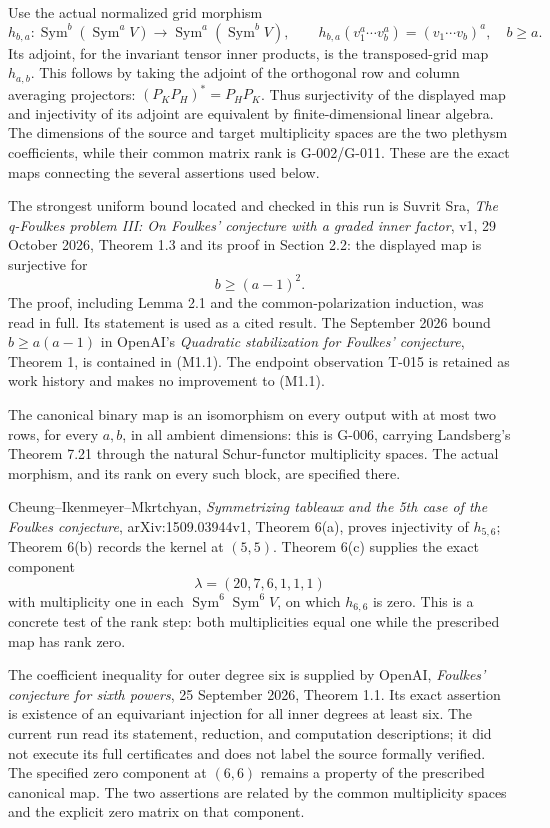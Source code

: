 \documentclass[
  10pt,
]{article}
\begin{document}
Use the actual normalized grid morphism \[
h_{b,a}:\operatorname{Sym}^{b}(\operatorname{Sym}^{a}V)
 \longrightarrow\operatorname{Sym}^{a}(\operatorname{Sym}^{b}V),
\qquad
h_{b,a}(v_1^a\cdots v_b^a)=(v_1\cdots v_b)^a,
\quad b\ge a.
\] Its adjoint, for the invariant tensor inner products, is the
transposed-grid map \(h_{a,b}\). This follows by taking the adjoint of
the orthogonal row and column averaging projectors:
\((P_KP_H)^*=P_HP_K\). Thus surjectivity of the displayed map and
injectivity of its adjoint are equivalent by finite-dimensional linear
algebra. The dimensions of the source and target multiplicity spaces are
the two plethysm coefficients, while their common matrix rank is
G-002/G-011. These are the exact maps connecting the several assertions
used below.

The strongest uniform bound located and checked in this run is Suvrit
Sra, \emph{The q-Foulkes problem III: On Foulkes' conjecture with a
graded inner factor}, v1, 29 October 2026, Theorem 1.3 and its proof in
Section 2.2: the displayed map is surjective for \[
b\ge(a-1)^2.
\tag{M1.1}
\] The proof, including Lemma 2.1 and the common-polarization induction,
was read in full. Its statement is used as a cited result. The September
2026 bound \(b\ge a(a-1)\) in OpenAI's \emph{Quadratic stabilization for
Foulkes' conjecture}, Theorem 1, is contained in (M1.1). The endpoint
observation T-015 is retained as work history and makes no improvement
to (M1.1).

The canonical binary map is an isomorphism on every output with at most
two rows, for every \(a,b\), in all ambient dimensions: this is G-006,
carrying Landsberg's Theorem 7.21 through the natural Schur-functor
multiplicity spaces. The actual morphism, and its rank on every such
block, are specified there.

Cheung--Ikenmeyer--Mkrtchyan, \emph{Symmetrizing tableaux and the 5th
case of the Foulkes conjecture}, arXiv:1509.03944v1, Theorem 6(a),
proves injectivity of \(h_{5,6}\); Theorem 6(b) records the kernel at
\((5,5)\). Theorem 6(c) supplies the exact component \[
\lambda=(20,7,6,1,1,1)
\] with multiplicity one in each
\(\operatorname{Sym}^6\operatorname{Sym}^6 V\), on which \(h_{6,6}\) is
zero. This is a concrete test of the rank step: both multiplicities
equal one while the prescribed map has rank zero.

The coefficient inequality for outer degree six is supplied by OpenAI,
\emph{Foulkes' conjecture for sixth powers}, 25 September 2026, Theorem
1.1. Its exact assertion is existence of an equivariant injection for
all inner degrees at least six. The current run read its statement,
reduction, and computation descriptions; it did not execute its full
certificates and does not label the source formally verified. The
specified zero component at \((6,6)\) remains a property of the
prescribed canonical map. The two assertions are related by the common
multiplicity spaces and the explicit zero matrix on that component.
\end{document}
